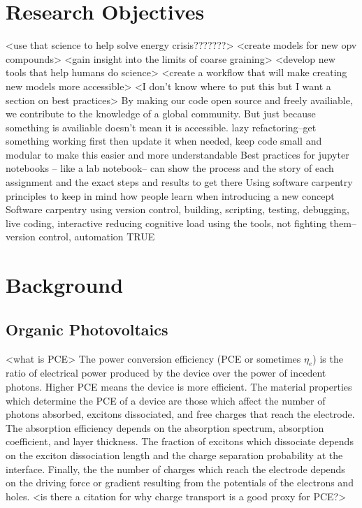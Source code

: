 \section*{Research Objectives}
<use that science to help solve energy crisis???????>
<create models for new opv compounds>
<gain insight into the limits of coarse graining>
<develop new tools that help humans do science>
<create a workflow that will make creating new models more accessible>
<I don't know where to put this but I want a section on best practices>
By making our code open source and freely availiable, we contribute to the knowledge of a global community. But just because something is availiable doesn't mean it is accessible. 
lazy refactoring--get something working first then update it when needed, keep code small and modular to make this easier and more understandable\cite{Adorf2018a} 
Best practices for jupyter notebooks -- like a lab notebook-- can show the process and the story of each assignment and the exact steps and results to get there\cite{Rule2019a}
Using software carpentry principles to keep in mind how people learn when introducing a new concept\cite{https://v4.software-carpentry.org/softeng/principles.html}
Software carpentry using version control, building, scripting, testing, debugging,\cite{Wilson2006}
live coding, interactive \cite{Wilson2016}
reducing cognitive load \cite{Jankowski2019}
using the tools, not fighting them--version control, automation \cite{Wilson2014}
TRUE\cite{Thompson2020}

\section*{Background}

\subsection*{Organic Photovoltaics}
<what is PCE>
The power conversion efficiency (PCE or sometimes $\eta_{e}$) is the ratio of electrical power produced by the device over the power of incedent photons.
Higher PCE means the device is more efficient.  
The material properties which determine the PCE of a device are those which affect the number of photons absorbed, excitons dissociated, and free charges that reach the electrode.
The absorption efficiency depends on the absorption spectrum, absorption coefficient, and layer thickness.
The fraction of excitons which dissociate depends on the exciton dissociation length and the charge separation probability at the interface.
Finally, the the number of charges which reach the electrode depends on the driving force or gradient resulting from the potentials of the electrons and holes.\cite{Hoppe2004}
<is there a citation for why charge transport is a good proxy for PCE?>

